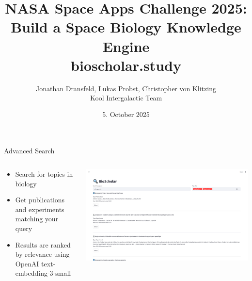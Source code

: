 \documentclass[t,aspectratio=169]{beamer}
\title{NASA Space Apps Challenge 2025:\\Build a Space Biology Knowledge Engine\\bioscholar.study}
\date{5. October 2025}
\author{Jonathan Dransfeld, Lukas Probst, Christopher von Klitzing\\Kool Intergalactic Team}
\institute{Karlsruhe Institute of Technology}
\begin{document}
\maketitle

\begin{frame}{Advanced Search}
	\begin{columns}[T]
		\begin{column}{.38\textwidth}
            \begin{itemize}
                \item Search for topics in biology
                \item Get publications and experiments matching your query
                \item Results are ranked by relevance using OpenAI text-embedding-3-small
            \end{itemize}
        \end{column}
		\begin{column}{.58\textwidth}
            \includegraphics[width=\textwidth]{images/1_search.png}
        \end{column}
    \end{columns}
\end{frame}
\end{document}
